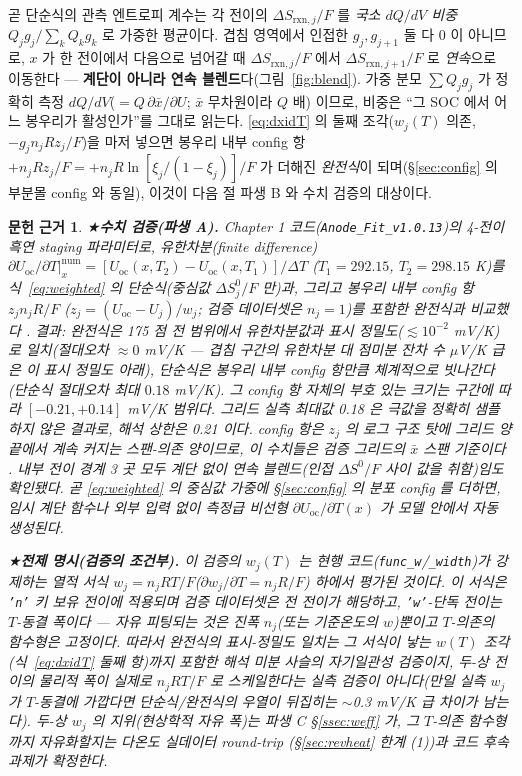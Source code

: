 \documentclass[11pt,a4paper]{article}
\newtheorem*{srcbox}{문헌 근거}
\newcommand{\rxn}{\mathrm{rxn}}
\newcommand{\oc}{\mathrm{oc}}
\begin{document}
곧 단순식의 관측 엔트로피 계수는 각 전이의 $\Delta S_{\rxn,j}/F$ 를 \emph{국소 $dQ/dV$ 비중}
$Q_jg_j/\sum_k Q_kg_k$ 로 가중한 평균이다. 겹침 영역에서 인접한 $g_j,g_{j+1}$ 둘 다 0 이 아니므로, $x$ 가 한
전이에서 다음으로 넘어갈 때 $\Delta S_{\rxn,j}/F$ 에서 $\Delta S_{\rxn,j+1}/F$ 로 \emph{연속}으로 이동한다 —
\textbf{계단이 아니라 연속 블렌드}다(그림~\ref{fig:blend}). 가중 분모 $\sum Q_jg_j$ 가 정확히 측정
$dQ/dV$($=Q\,\partial\bar x/\partial U$; $\bar x$ 무차원이라 $Q$ 배)
이므로, 비중은 ``그 SOC 에서 어느 봉우리가 활성인가''를 그대로 읽는다. \eqref{eq:dxidT} 의 둘째 조각($w_j(T)$
의존, $-g_jn_jRz_j/F$)을 마저 넣으면 봉우리 내부 config 항 $+n_jR z_j/F=+n_jR\ln[\xi_j/(1-\xi_j)]/F$ 가 더해진
\emph{완전식}이 되며(\S\ref{sec:config} 의 부분몰 config 와 동일), 이것이 다음 절 파생 B 와 수치 검증의 대상이다.

\begin{srcbox}
★\textbf{수치 검증(파생 A).} Chapter 1 코드(\texttt{Anode\_Fit\_v1.0.13})의 4-전이 흑연 staging 파라미터로,
유한차분(finite difference) $\partial U_\oc/\partial T|_x^\mathrm{num}=[U_\oc(x,T_2)-U_\oc(x,T_1)]/\Delta T$ ($T_1{=}292.15$,
$T_2{=}298.15$ K)를 식~\eqref{eq:weighted} 의 \emph{단순식}(중심값 $\Delta S^0_j/F$ 만)과, 그리고 봉우리 내부
config 항 $z_j n_jR/F$ ($z_j=(U_\oc-U_j)/w_j$; 검증 데이터셋은 $n_j{=}1$)를 포함한 \emph{완전식}과 비교했다 \cite{numverif2026}. 결과:
완전식은 175 점 전 범위에서 유한차분값과 표시 정밀도($\lesssim10^{-2}$ mV/K)로 일치(절대오차 $\approx0$ mV/K —
겹침 구간의 유한차분 대 점미분 잔차 수 $\mu$V/K 급은 이 표시 정밀도 아래), 단순식은 봉우리
내부 config 항만큼 체계적으로 빗나간다(단순식 절대오차 최대 $0.18$ mV/K). 그 config 항 자체의 부호 있는 크기는
구간에 따라 $[-0.21,+0.14]$ mV/K 범위다. 그리드 실측 최대값 0.18 은 극값을 정확히 샘플하지 않은 결과로,
해석 상한은 0.21 이다. config 항은 $z_j$ 의 로그 구조 탓에 그리드 양끝에서 계속 커지는 스팬-의존 양이므로,
이 수치들은 검증 그리드의 $\bar x$ 스팬 기준이다 \cite{numverif2026}. 내부 전이 경계 3 곳 모두 \emph{계단 없이} 연속 블렌드(인접 $\Delta S^0/F$
사이 값을 취함)임도 확인됐다. 곧 \eqref{eq:weighted} 의 중심값 가중에 \S\ref{sec:config} 의
분포 config 를 더하면, 임시 계단 함수나 외부 입력 없이 \emph{측정급 비선형} $\partial U_\oc/\partial T(x)$ 가
모델 안에서 자동 생성된다.

★\textbf{전제 명시(검증의 조건부).} 이 검증의 $w_j(T)$ 는 현행 코드(\texttt{func\_w}/\texttt{\_width})가
강제하는 열적 서식 $w_j=n_jRT/F$($\partial w_j/\partial T=n_jR/F$) 하에서 평가된 것이다. 이 서식은 \texttt{'n'}
키 보유 전이에 적용되며 검증 데이터셋은 전 전이가 해당하고, \texttt{'w'}-단독 전이는 $T$-동결 폭이다 —
자유 피팅되는 것은 진폭 $n_j$(또는 기준온도의 $w$)뿐이고 $T$-의존의 함수형은 고정이다. 따라서 완전식의 표시-정밀도 일치는 그 서식이 낳는 $w(T)$ 조각
(식~\eqref{eq:dxidT} 둘째 항)까지 포함한 \emph{해석 미분 사슬의 자기일관성} 검증이지, 두-상 전이의
물리적 폭이 실제로 $n_jRT/F$ 로 스케일한다는 \emph{실측 검증이 아니다}(만일 실측 $w_j$ 가 $T$-동결에
가깝다면 단순식/완전식의 우열이 뒤집히는 $\sim$0.3 mV/K 급 차이가 남는다). 두-상 $w_j$ 의 지위(현상학적
자유 폭)는 파생 C \S\ref{ssec:weff} 가, 그 $T$-의존 함수형까지 자유화할지는 다온도 실데이터 round-trip
(\S\ref{sec:revheat} 한계 (1))과 코드 후속 과제가 확정한다.
\end{srcbox}
\end{document}
